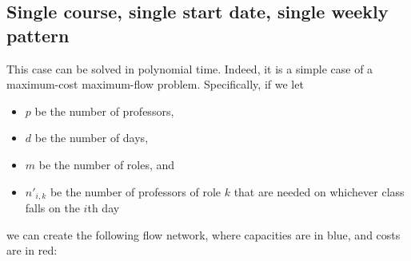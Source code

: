 \subsection{Single course, single start date, single weekly pattern}

This case can be solved in polynomial time. Indeed, it is a simple case of a maximum-cost maximum-flow problem. Specifically, if we let \begin{itemize}
\item $p$ be the number of professors,
\item $d$ be the number of days,
\item $m$ be the number of roles, and
\item $n'_{i, k}$ be the number of professors of role $k$ that are needed on whichever class falls on the $i$th day
\end{itemize}

we can create the following flow network, where capacities are in blue, and costs are in red:

\vspace{10pt}

